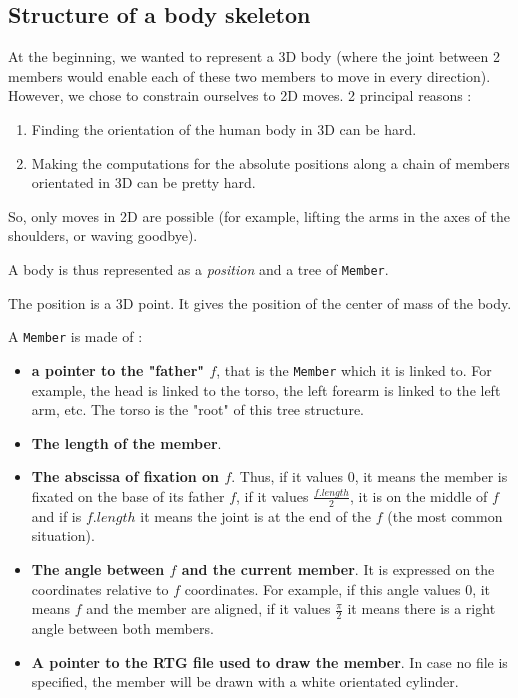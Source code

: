 \documentclass{article}
\begin{document}
        \subsection{Structure of a body skeleton}
\label{body_skeleton}
At the beginning, we wanted to represent a 3D body
(where the joint between 2 members would enable each of these two members to move in every direction).
However, we chose to constrain ourselves to 2D moves. 2 principal reasons :
\begin{enumerate}
    \item Finding the orientation of the human body in 3D can be hard.
    \item Making the computations for the absolute positions along a chain of members orientated in 3D
    can be pretty hard.
\end{enumerate}

So, only moves in 2D are possible
(for example, lifting the arms in the axes of the shoulders,
or waving goodbye).

A body is thus represented as a \textit{position} and a tree of \verb|Member|.

The position is a 3D point. It gives the position of the center of mass of the body.

A \verb|Member| is made of :
\begin{itemize}
    \item \textbf{a pointer to the "father" $f$}, that is the \verb|Member| which it is linked to.
    For example,
    the head is linked to the torso,
    the left forearm is linked to the left arm, etc.
    The torso is the "root" of this tree structure.

    \item \textbf{The length of the member}.

    \item \textbf{The abscissa of fixation on $f$}.
    Thus, if it values 0, it means the member is fixated on the base of its father $f$,
    if it values $\frac {f.length} 2$, it is on the middle of $f$
    and if is $f.length$ it means the joint is at the end of the $f$ (the most common situation).

    \item \textbf{The angle between $f$ and the current member}.
    It is expressed on the coordinates relative to $f$ coordinates.
    For example, if this angle values 0, it means $f$ and the member are aligned,
    if it values $\frac \pi 2$ it means there is a right angle between both members.

    \item \textbf{A pointer to the RTG file used to draw the member}.
    In case no file is specified, the member will be drawn with a white orientated cylinder.
\end{itemize}
\end{document}
